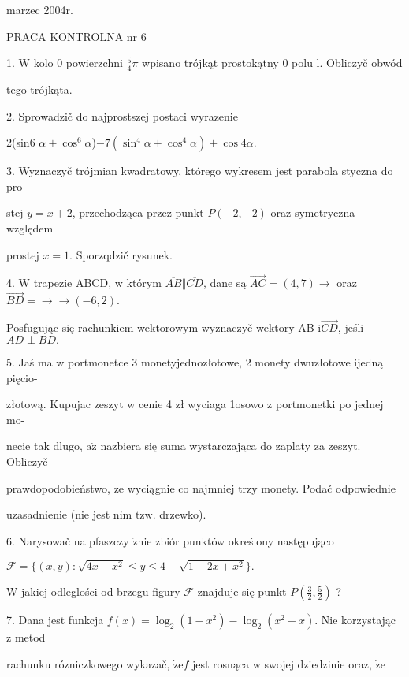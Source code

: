 \documentclass[a4paper,12pt]{article}
\begin{document}
marzec 2004r.

PRACA KONTROLNA nr 6

1. $\mathrm{W}$ kolo $0$ powierzchni $\displaystyle \frac{5}{4}\pi$ wpisano trójkąt prostokątny $0$ polu l. Obliczyč obwód

tego trójkąta.

2. Sprowadzič do najprostszej postaci wyrazenie

2(sin6 $\alpha+\cos^{6}\alpha$)$-7(\sin^{4}\alpha+\cos^{4}\alpha)+\cos 4\alpha.$

3. Wyznaczyč trójmian kwadratowy, którego wykresem jest parabola styczna do pro-

stej $y=x+2$, przechodząca przez punkt $P(-2,-2)$ oraz symetryczna względem

prostej $x=1$. Sporzqdzič rysunek.

4. $\mathrm{W}$ trapezie ABCD, $\mathrm{w}$ którym $\overline{AB}\Vert\overline{CD}$, dane są $\vec{AC}=(4,7)\rightarrow$ oraz $\vec{BD}=\rightarrow\rightarrow(-6,2).$

Posfugując się rachunkiem wektorowym wyznaczyč wektory AB $\mathrm{i}\vec{CD}$, jeśli $AD\perp BD.$

5. Jaś ma $\mathrm{w}$ portmonetce 3 monetyjednozłotowe, 2 monety dwuzłotowe ijedną pięcio-

złotową. Kupujac zeszyt $\mathrm{w}$ cenie 4 zł wyciaga 1osowo $\mathrm{z}$ portmonetki po jednej mo-

necie tak dlugo, $\mathrm{a}\dot{\mathrm{z}}$ nazbiera się suma wystarczająca do zaplaty za zeszyt. Obliczyč

prawdopodobieństwo, $\dot{\mathrm{z}}\mathrm{e}$ wyciągnie co najmniej trzy monety. Podač odpowiednie

uzasadnienie (nie jest nim $\mathrm{t}\mathrm{z}\mathrm{w}$. drzewko).

6. Narysowač na pfaszczy $\acute{\mathrm{z}}\mathrm{n}\mathrm{i}\mathrm{e}$ zbiór punktów określony następująco

$\mathcal{F}=\{(x,y):\sqrt{4x-x^{2}}\leq y\leq 4-\sqrt{1-2x+x^{2}}\}.$

$\mathrm{W}$ jakiej odleglości od brzegu figury $\mathcal{F}$ znajduje się punkt $P(\displaystyle \frac{3}{2},\frac{5}{2})$ ?

7. Dana jest funkcja $f(x) = \log_{2}(1-x^{2})-\log_{2}(x^{2}-x)$. Nie korzystając $\mathrm{z}$ metod

rachunku rózniczkowego wykazač, $\dot{\mathrm{z}}\mathrm{e}f$ jest rosnąca $\mathrm{w}$ swojej dziedzinie oraz, $\dot{\mathrm{z}}\mathrm{e}$
\end{document}
